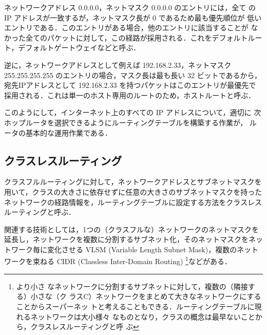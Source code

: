 ネットワークアドレス 0.0.0.0，ネットマスク 0.0.0.0 のエントリには，全て
の IP アドレスが一致するが，ネットマスク長が 0 であるため最も優先順位が
低いエントリである．このエントリがある場合，他のエントリに該当することが
なかった全てのパケットに対して，この経路が採用される．これをデフォルトルー
ト，デフォルトゲートウェイなどと呼ぶ．

逆に，ネットワークアドレスとして例えば 192.168.2.33，ネットマスク
255.255.255.255 のエントリの場合，マスク長は最も長い 32 ビットであるから，
宛先IPアドレスとして 192.168.2.33 を持つパケットはこのエントリが最優先で
採用される．これは単一のホスト専用のルートのため，ホストルートと呼ぶ．

このようにして，インターネット上のすべての IP アドレスについて，適切に
次ホップルータを選択できるようにルーティングテーブルを構築する作業が，
ルータの基本的な運用作業である．

\subsection{クラスレスルーティング}
クラスフルルーティングに対して，ネットワークアドレスとサブネットマスクを
用いて，クラスの大きさに依存せずに任意の大きさのサブネットマスクを持った
ネットワークの経路情報を，ルーティングテーブルに設定する方法をクラスレス
ルーティングと呼ぶ．

関連する技術としては，1つの（クラスフルな）ネットワークのネットマスクを
延長し，ネットワークを複数に分割するサブネット化，そのネットマスクをネッ
トワーク毎に変化させる VLSM (Variable Length Subnet Mask)，複数のネット
ワークを束ねる CIDR (Classless Inter-Domain Routing) \footnote{より小さ
なネットワークに分割するサブネットに対して，複数の（隣接する）小さな（ク
ラスC）ネットワークをまとめて大きなネットワークにすることからスーパーネッ
トと考えることもできる．ルーティングテーブルに現れるネットワークは大小様々
なものとなり，クラスの概念は最早ないことから，クラスレスルーティングと呼
ぶ}などがある．

